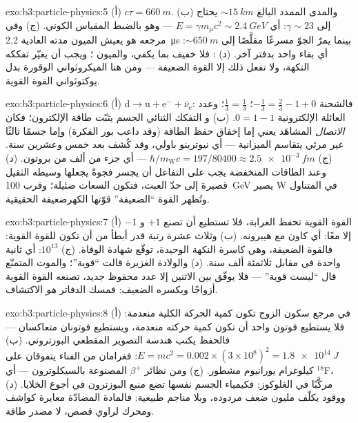 \begin{solution}{exo:b3:particle-physics:5}
(أ) $c\tau = \qty{660}{m}$. (ب) والمدى الممدد البالغ
${\sim}\qty{15}{km}$ يحتاج إلى $\gamma \sim 23$: أي $E = \gamma
m_\mu c^2 \sim \qty{2.4}{GeV}$ --- وهو بالضبط المقياس الكوني. (ج)
وفي مرجعه هو يعيش الميون مدته العادية \qty{2.2}{\micro s}
بينما يمرّ الجوّ مسرعًا مقلَّصًا إلى
${\sim}\qty{650}{m}$: أي بقاء واحد بدفتر آخر. (د) : فلا  خفيف بما يكفي، والميون
؛ ويجب أن يغيّر تفككه النكهة، ولا تفعل ذلك إلا القوة الضعيفة
--- ومن هنا الميكروثواني الوقورة بدل يوكتوثواني
القوة القوية.
\end{solution}

\begin{solution}{exo:b3:particle-physics:6}
(أ) $\text{d} \to \text{u} + \text{e}^- + \bar\nu_{\text{e}}$:
فالشحنة $-\tfrac13 = \tfrac23 - 1 + 0$؛ 
$\tfrac13 = \tfrac13$؛ وعدد العائلة الإلكترونية $0 = 1 - 1$. (ب) و
التفكك الثنائي الجسم يثبّت طاقة الإلكترون؛ فكان \emph{الاتصال}
المشاهَد يعني إما إخفاق حفظ الطاقة
(وقد داعب بور الفكرة) وإما جسمًا ثالثًا غير مرئي يتقاسم
الميزانية --- أي نيوترينو باولي، وقد كُشف بعد خمس وعشرين سنة.
(ج) $\hbar/m_{\text{W}}c = 197/80400 \approx
\qty{2.5e-3}{fm}$ --- أي جزء من ألف من بروتون. (د) وعند الطاقات
المنخفضة يجب على التفاعل أن يجسر فجوةً يجعلها وسيطه الثقيل
قصيرة إلى حدّ العبث، فتكون السعات ضئيلة؛ وقرب
\qty{100}{GeV} يصير W في المتناول وتُظهر القوة ``الضعيفة''
قوّتها الكهرضعيفة الحقيقية.
\end{solution}

\begin{solution}{exo:b3:particle-physics:7}
(أ) القوة القوية تحفظ الغرابة، فلا تستطيع أن تصنع
$+1$ و $-1$ إلا معًا: أي كاون مع هيبرونه. (ب) وثلاث عشرة
رتبة قدر أبطأ من أن تكون للقوة القوية: فالقوة
الضعيفة، وهي كاسرة النكهة الوحيدة، توقّع شهادة الوفاة.
(ج) $10^{13}$: أي ثانية واحدة في مقابل ثلاثمئة ألف سنة.
(د) والولادة الغزيرة قالت ``قوية''؛ والموت المتمنّع قال ``ليست
قوية'' --- فلا يوفّق بين الاثنين إلا عدد محفوظ جديد، تصنعه القوة
القوية أزواجًا ويكسره الضعيف: فمسك الدفاتر
\emph{هو} الاكتشاف.
\end{solution}

\begin{solution}{exo:b3:particle-physics:8}
(أ) في مرجع سكون الزوج تكون كمية الحركة الكلية منعدمة: فلا يستطيع
فوتون واحد أن تكون كمية حركته منعدمة، ويستطيع فوتونان متعاكسان ---
فالحفظ يكتب هندسة التصوير المقطعي البوزتروني. (ب) $E = mc^2 =
0.002\times(3\times10^8)^2 = \qty{1.8e14}{J}$: فغرامان من
الفناء يتفوقان على كيلوغرام يورانيوم مشطور. (ج) ومن
نظائر $\beta^+$ المصنوعة بالسيكلوترون --- أي $^{18}$F، مركَّبًا في
الغلوكوز: فكيمياء الجسم نفسها تضع منبع البوزترون في
أجوع الخلايا. (د) ووقود يكلّف مليون ضعف
مردوده، وبلا مناجم طبيعية: فالمادة المضادّة معايرة
كواشف ومحرك لراوي قصص، لا مصدر طاقة.
\end{solution}

